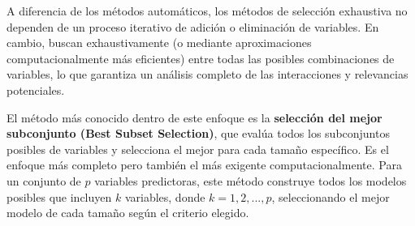 \documentclass[
  letterpaper,
  DIV=11,
  numbers=noendperiod]{scrreprt}
\begin{document}
A diferencia de los métodos automáticos, los métodos de selección
exhaustiva no dependen de un proceso iterativo de adición o eliminación
de variables. En cambio, buscan exhaustivamente (o mediante
aproximaciones computacionalmente más eficientes) entre todas las
posibles combinaciones de variables, lo que garantiza un análisis
completo de las interacciones y relevancias potenciales.

El método más conocido dentro de este enfoque es la \textbf{selección
del mejor subconjunto (Best Subset Selection)}, que evalúa todos los
subconjuntos posibles de variables y selecciona el mejor para cada
tamaño específico. Es el enfoque más completo pero también el más
exigente computacionalmente. Para un conjunto de \(p\) variables
predictoras, este método construye todos los modelos posibles que
incluyen \(k\) variables, donde \(k = 1, 2, ..., p\), seleccionando el
mejor modelo de cada tamaño según el criterio elegido.
\end{document}
